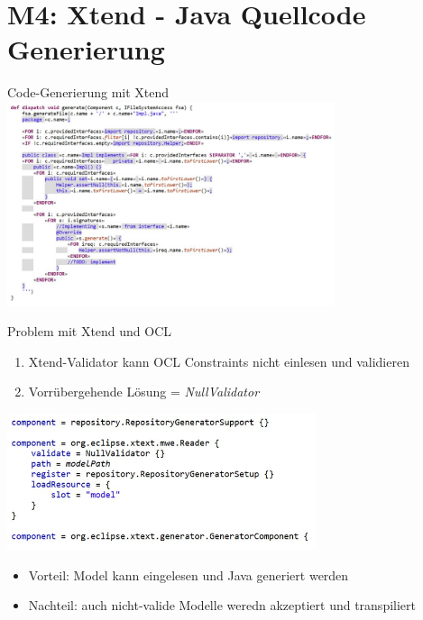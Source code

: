 \section[M4: Xtend]{M4: Xtend - Java Quellcode Generierung}
\begin{frame}{Code-Generierung mit Xtend}
	\centering
	\includegraphics[height=60mm]{figures/xtend.png}
\end{frame}

\begin{frame}{Problem mit Xtend und OCL}
	\begin{enumerate}
		\item Xtend-Validator kann OCL Constraints nicht einlesen und validieren
		\item Vorrübergehende Lösung = \textit{NullValidator}
	\end{enumerate}
	\centering
	\includegraphics[height=40mm]{figures/xtend-validator.png}
	\begin{itemize}
		\item Vorteil: Model kann eingelesen und Java generiert werden
		\item Nachteil: auch nicht-valide Modelle weredn akzeptiert und transpiliert
	\end{itemize}
\end{frame}